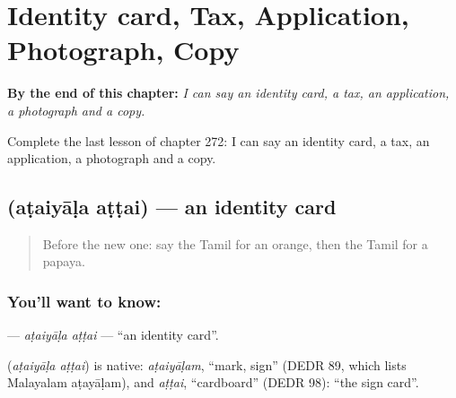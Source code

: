 
\chapter{Identity card, Tax, Application, Photograph, Copy}
\label{ch:ta-identity-card-tax-application-photograph-copy}

\begin{chapteropening}
\textbf{By the end of this chapter:} \emph{I can say an identity card, a tax, an application, a photograph and a copy.}

Complete the last lesson of chapter 272: I can say an identity card, a tax, an application, a photograph and a copy.
\end{chapteropening}

\section[\texorpdfstring{\ta{அடையாள} \ta{அட்டை} (aṭaiyāḷa aṭṭai)}{அடையாள அட்டை (aṭaiyāḷa aṭṭai)}]{  (aṭaiyāḷa aṭṭai) — an identity card}

\label{lesson:TA-C272-ataiyala-attai}



\begin{quote}
Before the new one: say the Tamil for an orange, then the Tamil for a papaya.
\end{quote}

\subsection*{You'll want to know:  }
\textbf{ } — \emph{aṭaiyāḷa aṭṭai} — \textquotedblleft{}an identity card\textquotedblright{}.

\begin{cousinweb}
\textbf{ } (\emph{aṭaiyāḷa aṭṭai}) is native: \emph{aṭaiyāḷam}, \textquotedblleft{}mark, sign\textquotedblright{} (DEDR 89, which lists Malayalam aṭayāḷam), and \emph{aṭṭai}, \textquotedblleft{}cardboard\textquotedblright{} (DEDR 98): \textquotedblleft{}the sign card\textquotedblright{}.
\end{cousinweb}

